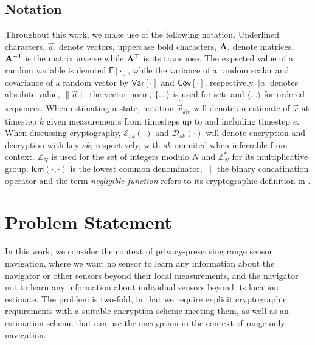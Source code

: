 \documentclass[10pt,letterpaper,oneside,twocolumn,journal]{IEEEtran}
\theoremstyle{definition}
\theoremstyle{definition}
\theoremstyle{remark}
\begin{document}
\subsection{Notation}
Throughout this work, we make use of the following notation. Underlined characters, $\vec{a}$, denote vectors, uppercase bold characters, ${{\mathbf{A}}}$, denote matrices. ${{\mathbf{A}}}^{-1}$ is the matrix inverse while ${{\mathbf{A}}}^\top$ is its transpose. The expected value of a random variable is denoted $\mathsf{E}[\cdot]$, while the variance of a random scalar and covariance of a random vector by $\mathsf{Var}[\cdot]$ and $\mathsf{Cov}[\cdot]$, respectively. $|a|$ denotes absolute value, $\lVert\vec{a}\rVert$ the vector norm, $\{\dots\}$ is used for sets and $\langle\dots\rangle$ for ordered sequences. When estimating a state, notation $\hat{\vec{x}}_{k|e}$ will denote an estimate of $\vec{x}$ at timestep $k$ given measurements from timesteps up to and including timestep $e$. When discussing cryptography, $\mathcal{E}_{sk}(\cdot)$ and $\mathcal{D}_{sk}(\cdot)$ will denote encryption and decryption with key $sk$, respectively, with $sk$ ommited when inferrable from context. $\mathbb{Z}_N$ is used for the set of integers modulo $N$ and $\mathbb{Z}^*_N$ for its multiplicative group. $\mathsf{lcm}(\cdot,\cdot)$ is the lowest common denominator, $\|$ the binary concatination operator and the term \textit{negligible function} refers to its cryptographic definition in \cite{katzIntroductionModernCryptography2008}.

% 
%                                                                                
%                                                                                
%                                                                                
% 

\section{Problem Statement} \label{sec:problem_statement}
In this work, we consider the context of privacy-preserving range sensor navigation, where we want no sensor to learn any information about the navigator or other sensors beyond their local measurements, and the navigator not to learn any information about individual sensors beyond its location estimate. The problem is two-fold, in that we require explicit cryptographic requirements with a suitable encryption scheme meeting them, as well as an estimation scheme that can use the encryption in the context of range-only navigation.
\end{document}
